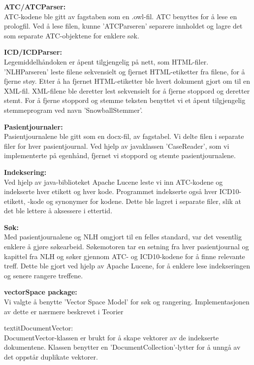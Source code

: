 \begin{description}
\item{\textbf{ATC/ATCParser:}}\\
ATC-kodene ble gitt av fagstaben som en .owl-fil. ATC benyttes for å lese en prologfil. Ved å lese filen, kunne 'ATCParseren' separere innholdet og lagre det som separate ATC-objektene for enklere søk.
\item{\textbf{ICD/ICDParser:}}\\
Legemiddelhåndoken er åpent tilgjengelig på nett, som HTML-filer. 'NLHParseren' leste filene sekvensielt og fjernet HTML-etiketter fra filene, for å fjerne støy. Etter å ha fjernet HTML-etiketter ble hvert dokument gjort om til en XML-fil. XML-filene ble deretter lest sekvensielt for å fjerne stoppord og deretter stemt. For å fjerne stoppord og stemme teksten benyttet vi et åpent tilgjengelig stemmeprogram ved navn 'SnowballStemmer'. 
\item{\textbf{Pasientjournaler:}}\\
Pasientjournalene ble gitt som en docx-fil, av fagstabel. Vi delte filen i separate filer for hver pasientjournal. Ved hjelp av javaklassen 'CaseReader', som vi implementerte på egenhånd, fjernet vi stoppord og stemte pasientjournalene.
\item{\textbf{Indeksering:}}\\
Ved hjelp av java-biblioteket Apache Lucene %
leste vi inn ATC-kodene og indekserte hver etikett og hver kode. Programmet indekserte også hver ICD10-etikett, -kode og synonymer for kodene. Dette ble lagret i separate filer, slik at det ble lettere å aksessere i ettertid.
\item{\textbf{Søk:}}\\
Med pasientjournalene og NLH omgjort til en felles standard, var det vesentlig enklere å gjøre søkearbeid. Søkemotoren tar en setning fra hver pasientjournal og kapittel fra NLH og søker gjennom ATC- og ICD10-kodene for å finne relevante treff. Dette ble gjort ved hjelp av Apache Lucene, for å enklere lese indekseringen og senere rangere treffene.
\item{\textbf{vectorSpace package:}}\\
Vi valgte å benytte 'Vector Space Model' for søk og rangering. Implementasjonen av dette er nærmere beskrevet i Teorier %
\begin{description}
\item{textit{DocumentVector: }} \\
DocumentVector-klassen er brukt for å skape vektorer av de indekserte dokumentene. Klassen benytter en 'DocumentCollection'-lytter for å unngå av det oppstår duplikate vektorer.

\end{description}
\end{description}
